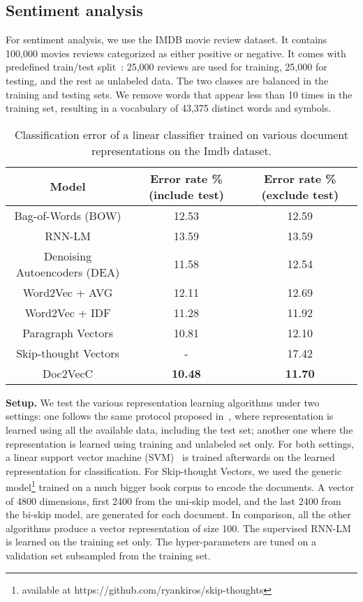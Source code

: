 \documentclass{article} \usepackage{iclr2017_conference,times}
\newcommand{\name}{Doc2VecC}
\begin{document}
\subsection{Sentiment analysis}
For sentiment analysis, we use the IMDB movie review dataset. It contains 100,000 movies reviews categorized as either positive or negative. It comes with predefined train/test split~\citep{maas2011learning}: 25,000 reviews are used for training, 25,000 for testing, and the rest as unlabeled data. The two classes are balanced in the training and testing sets. We remove words that appear less than 10 times in the training set, resulting in a vocabulary of 43,375 distinct words and symbols. 

\begin{table}
\caption{Classification error of a linear classifier trained on various document representations on the Imdb dataset. }
\label{tbl:sentiment}
\centering
\begin{tabular}{|c||c|c|}
\hline
Model &  Error rate \% (include test) & Error rate \% (exclude test)\\
\hline
\hline
Bag-of-Words (BOW) & 12.53  & 12.59\\
\hline
RNN-LM  & 13.59 & 13.59\\
\hline
Denoising Autoencoders (DEA) & 11.58 & 12.54\\
\hline
Word2Vec + AVG  & 12.11 &  12.69\\
Word2Vec + IDF & 11.28 & 11.92\\
\hline
Paragraph Vectors & 10.81 & 12.10 \\
\hline
Skip-thought Vectors & - & 17.42  \\
\hline
\name &  \textbf{10.48} & \textbf{11.70} \\
\hline
\end{tabular}
\end{table}

\textbf{Setup.} We test the various representation learning algorithms under two settings: one follows the same protocol proposed in~\citep{mesnil2014ensemble}, where representation is learned using all the available data, including the test set; another one where the representation is learned using training and unlabeled set only.  For both settings,  a linear support vector machine (SVM)~\citep{fan2008liblinear} is trained afterwards on the learned representation for classification.  For Skip-thought Vectors, we used the generic model\footnote{available at https://github.com/ryankiros/skip-thoughts} trained on a much bigger book corpus to encode the documents. A vector of 4800 dimensions, first 2400 from the uni-skip model, and the last 2400 from the bi-skip model, are generated for each document. In comparison, all the other algorithms produce a vector representation of size 100. The supervised RNN-LM is learned on the training set only. The hyper-parameters are tuned on a validation set subsampled from the training set. 
\end{document}
